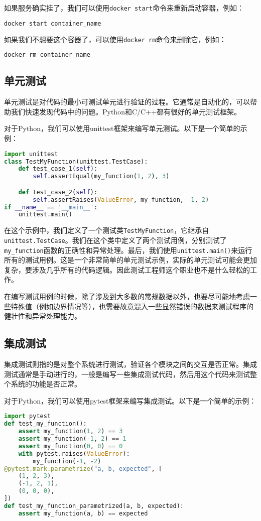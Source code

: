 \documentclass[../main.tex]{subfiles}
\begin{document}
如果服务确实挂了，我们可以使用\texttt{docker start}命令来重新启动容器，例如：
\begin{lstlisting}[language=bash]
    docker start container_name
\end{lstlisting}

如果我们不想要这个容器了，可以使用\texttt{docker rm}命令来删除它，例如：
\begin{lstlisting}[language=bash]
    docker rm container_name
\end{lstlisting}

\subsection{单元测试}

单元测试是对代码的最小可测试单元进行验证的过程。它通常是自动化的，可以帮助我们快速发现代码中的问题。Python和C/C++都有很好的单元测试框架。

对于Python，我们可以使用unittest框架来编写单元测试。以下是一个简单的示例：
\begin{lstlisting}[language=python]
import unittest
class TestMyFunction(unittest.TestCase):
    def test_case_1(self):
        self.assertEqual(my_function(1, 2), 3)

    def test_case_2(self):
        self.assertRaises(ValueError, my_function, -1, 2)
if __name__ == '__main__':
    unittest.main()
\end{lstlisting}
在这个示例中，我们定义了一个测试类\texttt{TestMyFunction}，它继承自\texttt{unittest.TestCase}。我们在这个类中定义了两个测试用例，分别测试了\texttt{my\_function}函数的正确性和异常处理。最后，我们使用\texttt{unittest.main()}来运行所有的测试用例。这是一个非常简单的单元测试示例，实际的单元测试可能会更加复杂，要涉及几乎所有的代码逻辑。因此测试工程师这个职业也不是什么轻松的工作。

在编写测试用例的时候，除了涉及到大多数的常规数据以外，也要尽可能地考虑一些特殊值（例如边界情况等），也需要故意混入一些显然错误的数据来测试程序的健壮性和异常处理能力。

\subsection{集成测试}

集成测试则指的是对整个系统进行测试，验证各个模块之间的交互是否正常。集成测试通常是手动进行的，一般是编写一些集成测试代码，然后用这个代码来测试整个系统的功能是否正常。

对于Python，我们可以使用pytest框架来编写集成测试。以下是一个简单的示例：
\begin{lstlisting}[language=python]
import pytest
def test_my_function():
    assert my_function(1, 2) == 3
    assert my_function(-1, 2) == 1
    assert my_function(0, 0) == 0
    with pytest.raises(ValueError):
        my_function(-1, -2)
@pytest.mark.parametrize("a, b, expected", [
    (1, 2, 3),
    (-1, 2, 1),
    (0, 0, 0),
])
def test_my_function_parametrized(a, b, expected):
    assert my_function(a, b) == expected
\end{lstlisting}
\end{document}
